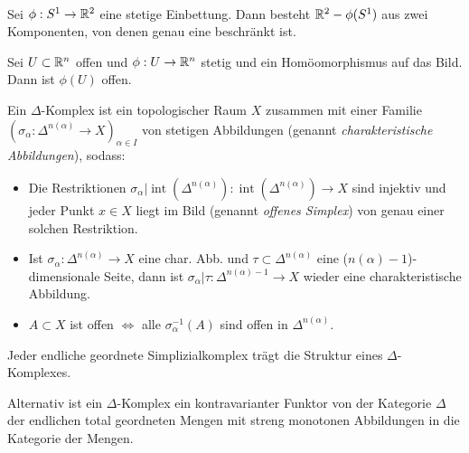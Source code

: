 \documentclass{cheat-sheet}
\DeclareMathOperator{\inte}{int} %
\begin{document}
\begin{kor}\mbox{}\\
  Sei $\phi : S^1 \to \mathbb{R}^2$ eine stetige Einbettung. Dann besteht $\mathbb{R}^2 - \phi(S^1)$ aus zwei Komponenten, von denen genau eine beschränkt ist.
\end{kor}


\begin{satz}
  Sei $U \subset \mathbb{R}^n$ offen und $\phi : U \to \mathbb{R}^n$ stetig und ein Homöomorphismus auf das Bild. Dann ist $\phi(U)$ offen. %
\end{satz}



\begin{defn}
  Ein $\Delta$-Komplex ist ein topologischer Raum $X$ zusammen mit einer Familie $(\sigma_\alpha : \Delta^{n(\alpha)} \to X)_{\alpha \in I}$ von stetigen Abbildungen (genannt \emph{charakteristische Abbildungen}), sodass:
  \begin{itemize}
    \item Die Restriktionen $\sigma_\alpha|\inte(\Delta^{n(\alpha)}) : \inte(\Delta^{n(\alpha)}) \to X$ sind injektiv und jeder Punkt $x \in X$ liegt im Bild (genannt \emph{offenes Simplex}) von genau einer solchen Restriktion.
    \item Ist $\sigma_\alpha : \Delta^{n(\alpha)} \to X$ eine char. Abb. und $\tau \subset \Delta^{n(\alpha)}$ eine ($n(\alpha)-1$)-dimensionale Seite, dann ist $\sigma_\alpha|\tau : \Delta^{n(\alpha)-1} \to X$ wieder eine charakteristische Abbildung.
    \item $A \subset X$ ist offen $\iff$ alle $\sigma_\alpha^{-1}(A)$ sind offen in $\Delta^{n(\alpha)}$.
  \end{itemize}
\end{defn}

\begin{bem}
  Jeder endliche geordnete Simplizialkomplex trägt die Struktur eines $\Delta$-Komplexes.
\end{bem}

\begin{bem}
  Alternativ ist ein $\Delta$-Komplex ein kontravarianter Funktor von der Kategorie $\Delta$ der endlichen total geordneten Mengen mit streng monotonen Abbildungen in die Kategorie der Mengen.
\end{bem}
\end{document}
